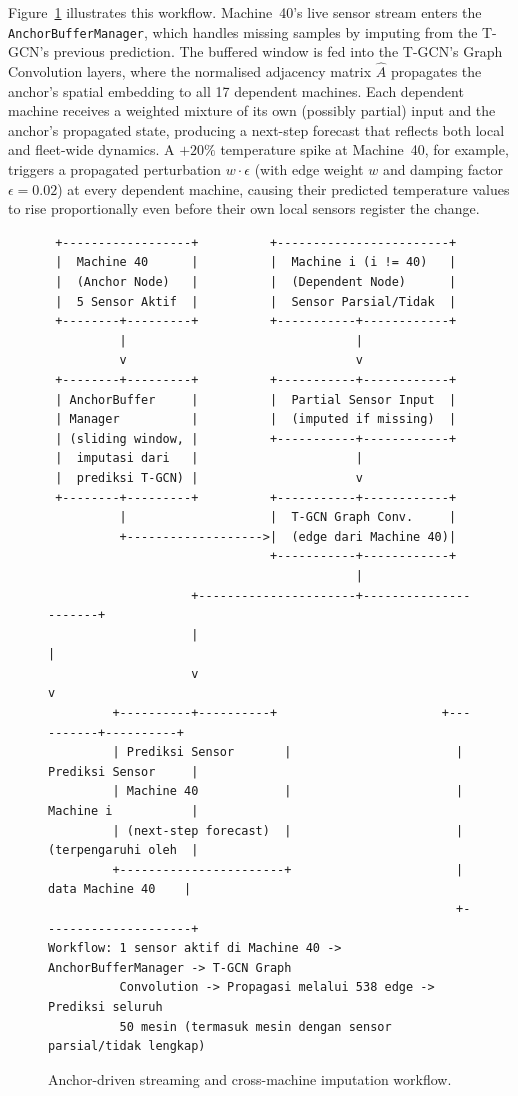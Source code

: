 Figure~\ref{fig:anchor_workflow} illustrates this workflow. Machine~40's live sensor stream enters the \texttt{AnchorBufferManager}, which handles missing samples by imputing from the T-GCN's previous prediction. The buffered window is fed into the T-GCN's Graph Convolution layers, where the normalised adjacency matrix $\hat{A}$ propagates the anchor's spatial embedding to all 17 dependent machines. Each dependent machine receives a weighted mixture of its own (possibly partial) input and the anchor's propagated state, producing a next-step forecast that reflects both local and fleet-wide dynamics. A $+20\%$ temperature spike at Machine~40, for example, triggers a propagated perturbation $w \cdot \epsilon$ (with edge weight $w$ and damping factor $\epsilon = 0.02$) at every dependent machine, causing their predicted temperature values to rise proportionally even before their own local sensors register the change.
\begin{figure}[!htbp]
\centering
\begin{minipage}{0.95\textwidth}
\small
\begin{verbatim}
 +------------------+          +------------------------+
 |  Machine 40      |          |  Machine i (i != 40)   |
 |  (Anchor Node)   |          |  (Dependent Node)      |
 |  5 Sensor Aktif  |          |  Sensor Parsial/Tidak  |
 +--------+---------+          +-----------+------------+
          |                                |
          v                                v
 +--------+---------+          +-----------+------------+
 | AnchorBuffer     |          |  Partial Sensor Input  |
 | Manager          |          |  (imputed if missing)  |
 | (sliding window, |          +-----------+------------+
 |  imputasi dari   |                      |
 |  prediksi T-GCN) |                      v
 +--------+---------+          +-----------+------------+
          |                    |  T-GCN Graph Conv.     |
          +------------------->|  (edge dari Machine 40)|
                               +-----------+------------+
                                           |
                    +----------------------+----------------------+
                    |                                             |
                    v                                             v
         +----------+----------+                       +----------+----------+
         | Prediksi Sensor       |                       | Prediksi Sensor     |
         | Machine 40            |                       | Machine i           |
         | (next-step forecast)  |                       | (terpengaruhi oleh  |
         +-----------------------+                       |  data Machine 40    |
                                                         +---------------------+
Workflow: 1 sensor aktif di Machine 40 -> AnchorBufferManager -> T-GCN Graph
          Convolution -> Propagasi melalui 538 edge -> Prediksi seluruh
          50 mesin (termasuk mesin dengan sensor parsial/tidak lengkap)
\end{verbatim}
\end{minipage}
\caption{Anchor-driven streaming and cross-machine imputation workflow.}
\label{fig:anchor_workflow}
\end{figure}
